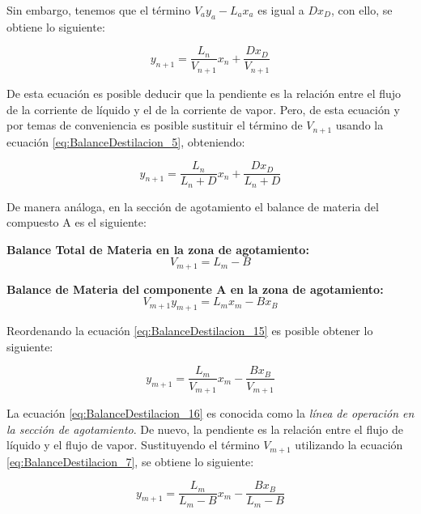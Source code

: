 \documentclass[11pt]{book}
\begin{document}
Sin embargo, tenemos que el término $V_a y_a - L_a x_a$ es igual a $D x_D$, con ello, se obtiene lo siguiente:

\begin{equation}
    \label{eq:BalanceDestilacion_12}
    y_{n+1} = \frac{L_n}{V_{n+1}} x_n + \frac{D x_D}{V_{n+1}}
\end{equation}

De esta ecuación es posible deducir que la pendiente es la relación entre el flujo de la corriente de líquido y el de la corriente de vapor. Pero, de esta ecuación y por temas de conveniencia es posible sustituir el término de $V_{n+1}$ usando la ecuación \ref{eq:BalanceDestilacion_5}, obteniendo:

\begin{equation}
    \label{eq:BalanceDestilacion_13}
    y_{n+1} = \frac{L_n}{L_n + D} x_n + \frac{D x_D}{L_n + D}
\end{equation}

De manera análoga, en la sección de agotamiento el balance de materia del compuesto A es el siguiente:

\textbf{Balance Total de Materia en la zona de agotamiento:}
\begin{equation}
    \label{eq:BalanceDestilacion_14}
    V_{m+1} = L_{m} - B
\end{equation}

\textbf{Balance de Materia del componente A en la zona de agotamiento:}
\begin{equation}
    \label{eq:BalanceDestilacion_15}
    V_{m+1} y_{m+1} = L_{m} x_{m} - B x_{B}
\end{equation}

Reordenando la ecuación \ref{eq:BalanceDestilacion_15} es posible obtener lo siguiente:

\begin{equation}
    \label{eq:BalanceDestilacion_16}
    y_{m+1} = \frac{L_m}{V_{m+1}} x_m - \frac{B x_B}{V_{m+1}}
\end{equation}

La ecuación \ref{eq:BalanceDestilacion_16} es conocida como la \textit{línea de operación en la sección de agotamiento}. De nuevo, la pendiente es la relación entre el flujo de líquido y el flujo de vapor. Sustituyendo el término $V_{m+1}$ utilizando la ecuación \ref{eq:BalanceDestilacion_7}, se obtiene lo siguiente:

\begin{equation}
    \label{eq:BalanceDestilacion_17}
    y_{m+1} = \frac{L_m}{L_m - B} x_m - \frac{B x_B}{L_m - B}
\end{equation}
\end{document}
